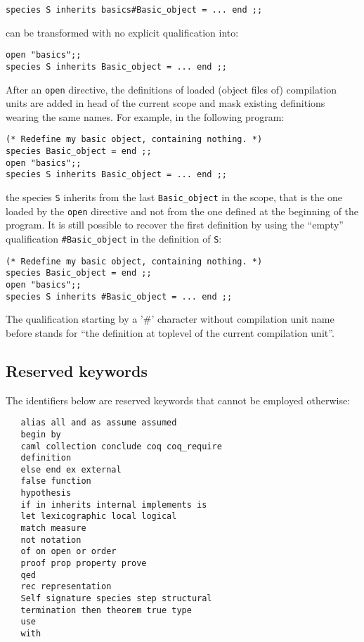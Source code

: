 {\scriptsize
\begin{lstlisting}
species S inherits basics#Basic_object = ... end ;;
\end{lstlisting}
}
can be transformed with no explicit qualification into:
{\scriptsize
\begin{lstlisting}
open "basics";;
species S inherits Basic_object = ... end ;;
\end{lstlisting}
}

After an {\tt open} directive, the definitions of loaded (object files
of) compilation units are added in head of the current scope and mask
existing definitions wearing the same names. For example, in
the following program: {\scriptsize
\begin{lstlisting}
(* Redefine my basic object, containing nothing. *)
species Basic_object = end ;;
open "basics";;
species S inherits Basic_object = ... end ;;
\end{lstlisting}
}
the species {\tt S} inherits from the last {\tt Basic\_object} in the
scope, that is the one loaded by the {\tt open} directive and not from
the one defined at the beginning of the program. It is still possible
to recover the first definition by using the ``empty'' qualification
{\tt \#Basic\_object} in the definition of {\tt S}:
{\scriptsize
\begin{lstlisting}
(* Redefine my basic object, containing nothing. *)
species Basic_object = end ;;
open "basics";;
species S inherits #Basic_object = ... end ;;
\end{lstlisting}
}

The qualification starting by a '\#' character without compilation
unit name before stands for ``the definition at toplevel of the
current compilation unit''.

\subsection{Reserved keywords}
The identifiers below are reserved keywords that cannot be employed
otherwise:
\begin{verbatim}
   alias all and as assume assumed
   begin by
   caml collection conclude coq coq_require
   definition
   else end ex external
   false function
   hypothesis
   if in inherits internal implements is
   let lexicographic local logical
   match measure
   not notation
   of on open or order
   proof prop property prove
   qed
   rec representation
   Self signature species step structural
   termination then theorem true type
   use
   with
\end{verbatim}
